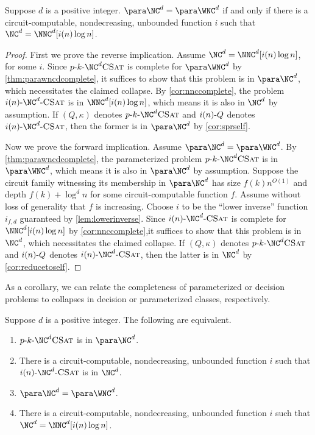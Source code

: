 \begin{theorem}\label{thm:ncwnc}
  Suppose $d$ is a positive integer.
  $\para \NC^d = \para \WNC^d$ if and only if there is a circuit-computable, nondecreasing, unbounded function $i$ such that $\NC^d = \NNC^d[i(n) \log n]$.
\end{theorem}
\begin{proof}
  First we prove the reverse implication.
  Assume $\NC^d = \NNC^d[i(n) \log n]$, for some $i$.
  Since $\pNCSAT$ is complete for $\para \WNC^d$ by \autoref{thm:parawncdcomplete}, it suffices to show that this problem is in $\para \NC^d$, which necessitates the claimed collapse.
  By \autoref{cor:nnccomplete}, the problem $\iNCSAT$ is in $\NNC^d[i(n) \log n]$, which means it is also in $\NC^d$ by assumption.
  If $(Q, \kappa)$ denotes $\pNCSAT$ and $i(n) \textnormal{-} Q$ denotes $\iNCSAT$, then the former is in $\para \NC^d$ by \autoref{cor:sprself}.

  Now we prove the forward implication.
  Assume $\para \NC^d = \para \WNC^d$.
  By \autoref{thm:parawncdcomplete}, the parameterized problem $\pNCSAT$ is in $\para \WNC^d$, which means it is also in $\para \NC^d$ by assumption.
  Suppose the circuit family witnessing its membership in $\para \NC^d$ has size $f(k) n^{O(1)}$ and depth $f(k) + \log^d n$ for some circuit-computable function $f$.
  Assume without loss of generality that $f$ is increasing.
  Choose $i$ to be the ``lower inverse'' function $i_{f, d}$ guaranteed by \autoref{lem:lowerinverse}.
  Since $\iNCSAT$ is complete for $\NNC^d[i(n) \log n]$ by \autoref{cor:nnccomplete},it suffices to show that this problem is in $\NC^d$, which necessitates the claimed collapse.
  If $(Q, \kappa)$ denotes $\pNCSAT$ and $i(n) \textnormal{-} Q$ denotes $\iNCSAT$, then the latter is in $\NC^d$ by \autoref{cor:reducetoself}.
\end{proof}

As a corollary, we can relate the completeness of parameterized or decision problems to collapses in decision or parameterized classes, respectively.

\begin{corollary}
  Suppose $d$ is a positive integer.
  The following are equivalent.
  \begin{enumerate}
  \item $\pNCSAT$ is in $\para \NC^d$.
  \item There is a circuit-computable, nondecreasing, unbounded function $i$ such that $\iNCSAT$ is in $\NC^d$.
  \item $\para \NC^d = \para \WNC^d$.
  \item There is a circuit-computable, nondecreasing, unbounded function $i$ such that $\NC^d = \NNC^d[i(n) \log n]$.
  \end{enumerate}
\end{corollary}

